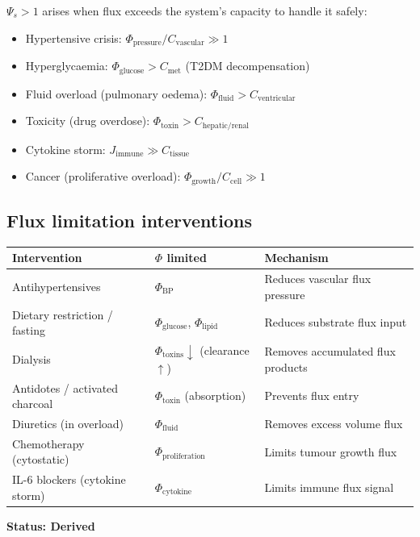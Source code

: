 \documentclass[12pt,a4paper]{article}
\begin{document}
$\Psi_s > 1$ arises when flux exceeds the system's capacity to handle it safely:
\begin{itemize}
    \item Hypertensive crisis: $\Phi_{\mathrm{pressure}} / C_{\mathrm{vascular}} \gg 1$
    \item Hyperglycaemia: $\Phi_{\mathrm{glucose}} > C_{\mathrm{met}}$ (T2DM decompensation)
    \item Fluid overload (pulmonary oedema): $\Phi_{\mathrm{fluid}} > C_{\mathrm{ventricular}}$
    \item Toxicity (drug overdose): $\Phi_{\mathrm{toxin}} > C_{\mathrm{hepatic/renal}}$
    \item Cytokine storm: $J_{\mathrm{immune}} \gg C_{\mathrm{tissue}}$
    \item Cancer (proliferative overload): $\Phi_{\mathrm{growth}} / C_{\mathrm{cell}} \gg 1$
\end{itemize}

\subsection{Flux limitation interventions}

\begin{center}
\begin{tabular}{lll}
\toprule
Intervention & $\Phi$ limited & Mechanism \\
\midrule
Antihypertensives & $\Phi_{\mathrm{BP}}$ & Reduces vascular flux pressure \\
Dietary restriction / fasting & $\Phi_{\mathrm{glucose}}$, $\Phi_{\mathrm{lipid}}$ & Reduces substrate flux input \\
Dialysis & $\Phi_{\mathrm{toxins}} \downarrow$ (clearance $\uparrow$) & Removes accumulated flux products \\
Antidotes / activated charcoal & $\Phi_{\mathrm{toxin}}$ (absorption) & Prevents flux entry \\
Diuretics (in overload) & $\Phi_{\mathrm{fluid}}$ & Removes excess volume flux \\
Chemotherapy (cytostatic) & $\Phi_{\mathrm{proliferation}}$ & Limits tumour growth flux \\
IL-6 blockers (cytokine storm) & $\Phi_{\mathrm{cytokine}}$ & Limits immune flux signal \\
\bottomrule
\end{tabular}
\end{center}

\textbf{Status: Derived}
\end{document}
